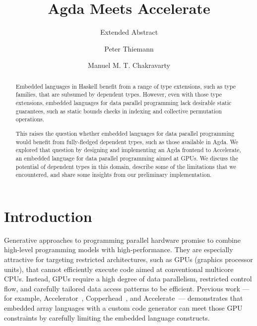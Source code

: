 \documentclass{llncs}
\begin{document}
%
\title{Agda Meets Accelerate}
\subtitle{Extended Abstract}
\author{Peter Thiemann \and Manuel M. T. Chakravarty}

\maketitle              %

\begin{abstract}  
  Embedded languages in Haskell benefit from a range of type extensions, such as type families, that are subsumed by dependent types. However, even with those type extensions, embedded languages for data parallel programming lack desirable static guarantees, such as static bounds checks in indexing and collective permutation operations.
  
  This raises the question whether embedded languages for data parallel programming would benefit from fully-fledged dependent types, such as those available in Agda. We explored that question by designing and implementing an Agda frontend to Accelerate, an embedded language for data parallel programming aimed at GPUs. We discuss the potential of dependent types in this domain, describe some of the limitations that we encountered, and share some insights from our preliminary implementation.
\end{abstract}
\thispagestyle{plain}
\pagestyle{plain}
%
\section{Introduction}
\label{sec:introduction}

Generative approaches to programming parallel hardware promise to combine high-level programming models with high-performance. They are especially attractive for targeting restricted architectures, such as GPUs (graphics processor units), that cannot efficiently execute code aimed at conventional multicore CPUs. Instead, GPUs require a high degree of data parallelism, restricted control flow, and carefully tailored data access patterns to be efficient. Previous work ---for example, Accelerator~\cite{??}, Copperhead~\cite{??}, and Accelerate~\cite{ChakravartyKellerLeeMcdonellGrover2011}--- demonstrates that embedded array languages with a custom code generator can meet those GPU constraints by carefully limiting the embedded language constructs.
\end{document}
